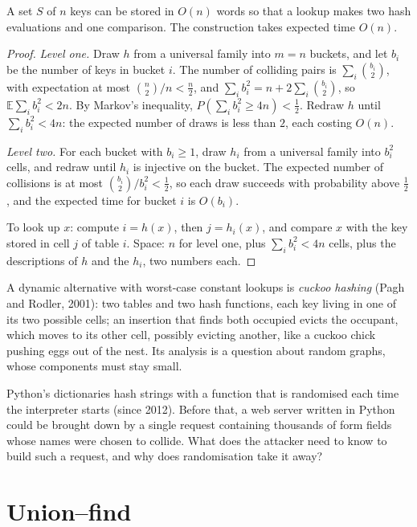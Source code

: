 \begin{theorem}\label{thm:fks}
A set $S$ of $n$ keys can be stored in $O(n)$ words so that a lookup makes two hash evaluations and one comparison. The construction takes expected time $O(n)$.
\end{theorem}
\begin{proof}
\emph{Level one.} Draw $h$ from a universal family into $m=n$ buckets, and let $b_i$ be the number of keys in bucket $i$. The number of colliding pairs is
$\sum_i\binom{b_i}2$, with expectation at most $\binom n2/n<\frac n2$, and $\sum_ib_i^2=n+2\sum_i\binom{b_i}2$, so $\mathbb E\sum_ib_i^2<2n$. By Markov's inequality,
$P(\sum_ib_i^2\ge4n)<\frac12$. Redraw $h$ until $\sum_ib_i^2<4n$: the expected number of draws is less than $2$, each costing $O(n)$.

\emph{Level two.} For each bucket with $b_i\ge1$, draw $h_i$ from a universal family into $b_i^2$ cells, and redraw until $h_i$ is injective on the bucket. The expected
number of collisions is at most $\binom{b_i}2/b_i^2<\frac12$, so each draw succeeds with probability above $\frac12$, and the expected time for bucket $i$ is $O(b_i)$.

To look up $x$: compute $i=h(x)$, then $j=h_i(x)$, and compare $x$ with the key stored in cell $j$ of table $i$. Space: $n$ for level one, plus $\sum_ib_i^2<4n$ cells,
plus the descriptions of $h$ and the $h_i$, two numbers each.
\end{proof}

A dynamic alternative with worst-case constant lookups is \emph{cuckoo hashing} (Pagh and Rodler, 2001): two tables and two hash functions, each key living in one
of its two possible cells; an insertion that finds both occupied evicts the occupant, which moves to its other cell, possibly evicting another, like a cuckoo
chick pushing eggs out of the nest. Its analysis is a question about random graphs, whose components must stay small.

\begin{think}
Python's dictionaries hash strings with a function that is randomised each time the interpreter starts (since 2012). Before that, a web server written in
Python could be brought down by a single request containing thousands of form fields whose names were chosen to collide. What does the attacker need to know
to build such a request, and why does randomisation take it away?
\end{think}

\section{Union--find}\label{sec:unionfind}

